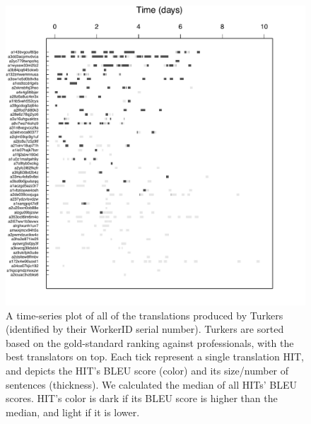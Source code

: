 \documentclass[11pt]{article}
\begin{document}
\begin{figure}[h!]
  \centering
  \includegraphics[width=\linewidth]{WorkerPerf/wp.pdf}
  \caption{A time-series plot of all of the translations produced by Turkers (identified by their WorkerID serial number). Turkers are sorted based on the gold-standard ranking against professionals, with the best translators on top. Each tick represent a single translation HIT, and depicts the HIT's BLEU score (color) and its size/number of sentences (thickness).  
  We calculated the median of all HITs' BLEU scores.   HIT's color is dark if its BLEU score is higher than the median, and light if it is lower. 
  }
    \label{fworkerperf}
\end{figure}
\end{document}
